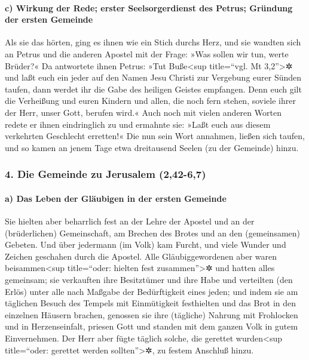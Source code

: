 \hypertarget{c-wirkung-der-rede-erster-seelsorgerdienst-des-petrus-gruxfcndung-der-ersten-gemeinde}{%
\paragraph{c) Wirkung der Rede; erster Seelsorgerdienst des Petrus;
Gründung der ersten
Gemeinde}\label{c-wirkung-der-rede-erster-seelsorgerdienst-des-petrus-gruxfcndung-der-ersten-gemeinde}}

 Als sie das hörten, ging es ihnen wie ein Stich durchs
Herz, und sie wandten sich an Petrus und die anderen Apostel mit der
Frage: »Was sollen wir tun, werte Brüder?«  Da antwortete
ihnen Petrus: »Tut Buße\textless sup title=``vgl. Mt 3,2''\textgreater✲
und laßt euch ein jeder auf den Namen Jesu Christi zur Vergebung eurer
Sünden taufen, dann werdet ihr die Gabe des heiligen Geistes empfangen.
 Denn euch gilt die Verheißung und euren Kindern und
allen, die noch fern stehen, soviele ihrer der Herr, unser Gott, berufen
wird.«  Auch noch mit vielen anderen Worten redete er
ihnen eindringlich zu und ermahnte sie: »Laßt euch aus diesem verkehrten
Geschlecht erretten!«  Die nun sein Wort annahmen, ließen
sich taufen, und so kamen an jenem Tage etwa dreitausend Seelen (zu der
Gemeinde) hinzu.

\hypertarget{die-gemeinde-zu-jerusalem-242-67}{%
\subsubsection{4. Die Gemeinde zu Jerusalem
(2,42-6,7)}\label{die-gemeinde-zu-jerusalem-242-67}}

\hypertarget{a-das-leben-der-gluxe4ubigen-in-der-ersten-gemeinde}{%
\paragraph{a) Das Leben der Gläubigen in der ersten
Gemeinde}\label{a-das-leben-der-gluxe4ubigen-in-der-ersten-gemeinde}}

 Sie hielten aber beharrlich fest an der Lehre der
Apostel und an der (brüderlichen) Gemeinschaft, am Brechen des Brotes
und an den (gemeinsamen) Gebeten.  Und über jedermann (im
Volk) kam Furcht, und viele Wunder und Zeichen geschahen durch die
Apostel.  Alle Gläubiggewordenen aber waren
beisammen\textless sup title=``oder: hielten fest
zusammen''\textgreater✲ und hatten alles gemeinsam;  sie
verkauften ihre Besitztümer und ihre Habe und verteilten (den Erlös)
unter alle nach Maßgabe der Bedürftigkeit eines jeden; 
und indem sie am täglichen Besuch des Tempels mit Einmütigkeit
festhielten und das Brot in den einzelnen Häusern brachen, genossen sie
ihre (tägliche) Nahrung mit Frohlocken und in Herzenseinfalt,
 priesen Gott und standen mit dem ganzen Volk in gutem
Einvernehmen. Der Herr aber fügte täglich solche, die gerettet
wurden\textless sup title=``oder: gerettet werden
sollten''\textgreater✲, zu festem Anschluß hinzu.

